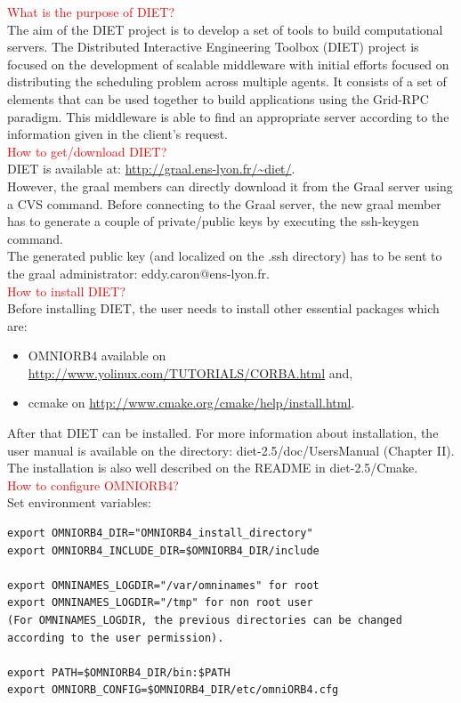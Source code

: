 \documentclass[12pt,a4paper]{book}
\newcommand{\dietversion}{2.5}
\begin{document}
\noindent \textcolor{red}{What is the purpose of DIET?}\\
The aim of the DIET project is to develop a set of tools to build computational servers. 
The Distributed Interactive Engineering Toolbox (DIET) project is focused on the development of scalable middleware with initial efforts focused on distributing the scheduling 
problem across multiple agents. It consists of a set of elements that can be used together to build applications using the Grid-RPC paradigm. 
This middleware is able to find an appropriate server according to the information given in the client's request.\\

\noindent \textcolor{red}{How to get/download DIET?}\\
DIET is available at: \url{http://graal.ens-lyon.fr/~diet/}.\\
  
\noindent However, the graal members can directly download it from the Graal server using a CVS command. Before connecting to the Graal server, the new graal member has to generate a couple
of private/public keys by executing the ssh-keygen command.\\
The generated public key (and localized on the .ssh directory) has to be sent to the graal administrator: eddy.caron@ens-lyon.fr.\\
 
\noindent \textcolor{red}{How to install DIET?}\\
Before installing DIET, the user needs to install other essential packages which are: 

\begin{itemize}
 \item OMNIORB4 available on \url{http://www.yolinux.com/TUTORIALS/CORBA.html} and,
 \item ccmake on \url{http://www.cmake.org/cmake/help/install.html}.\\
\end{itemize}

\noindent After that DIET can be installed. For more information about installation, the user manual is available on the directory: diet-\dietversion/doc/UsersManual (Chapter II). The installation is also well described on the README in diet-\dietversion/Cmake.\\ 
  
\noindent \textcolor{red}{How to configure OMNIORB4?}\\
Set environment variables:
\begin{verbatim}
export OMNIORB4_DIR="OMNIORB4_install_directory"
export OMNIORB4_INCLUDE_DIR=$OMNIORB4_DIR/include

export OMNINAMES_LOGDIR="/var/omninames" for root 
export OMNINAMES_LOGDIR="/tmp" for non root user 
(For OMNINAMES_LOGDIR, the previous directories can be changed according to the user permission).
 
export PATH=$OMNIORB4_DIR/bin:$PATH
export OMNIORB_CONFIG=$OMNIORB4_DIR/etc/omniORB4.cfg 
\end{verbatim}
\end{document}
